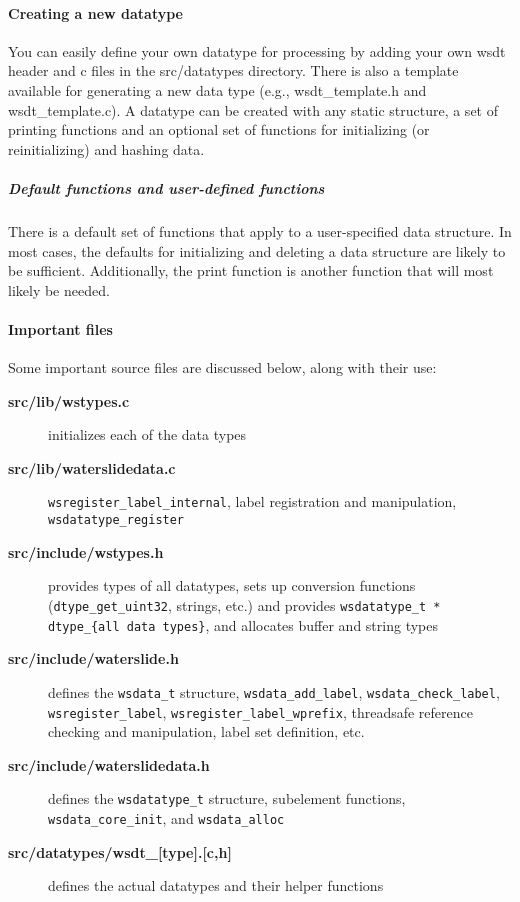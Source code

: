 \documentclass[11pt]{article}
\begin{document}
\paragraph{Creating a new datatype\newline\newline}

You can easily define your own datatype for processing by adding your own 
wsdt header and c files in the src/datatypes directory. There is also a 
template  available for generating a new data type (e.g., wsdt\_template.h and 
wsdt\_template.c).  A datatype can be created with any  static structure, a set
of printing functions and an optional set of functions for initializing (or 
reinitializing) and hashing data.

\subparagraph{Default functions and user-defined functions\newline\newline}
There is a default set of functions that apply to a user-specified data 
structure.  In most cases, the defaults for initializing and deleting a data 
structure are likely to be sufficient.  Additionally, the print function is 
another function that will most likely be needed.   

\paragraph{Important files\newline\newline}

Some important source files are discussed below, along with their use:
\begin{description}
\item[\textbf{src/lib/wstypes.c}] initializes each of the data types
\item[\textbf{src/lib/waterslidedata.c}] \texttt{wsregister\_label\_internal}, 
label registration and manipulation, \newline\texttt{wsdatatype\_register}
\item[\textbf{src/include/wstypes.h}] provides types of all datatypes, sets up 
conversion functions \newline(\texttt{dtype\_get\_uint32}, strings, etc.) and provides 
\texttt{wsdatatype\_t * dtype\_\{all data types\}}, and allocates buffer 
and string types
\item[\textbf{src/include/waterslide.h}] defines the \texttt{wsdata\_t} structure, 
\texttt{wsdata\_add\_label}, \newline\texttt{wsdata\_check\_label}, 
\texttt{wsregister\_label}, \texttt{wsregister\_label\_wprefix}, 
threadsafe reference checking and manipulation,  label set definition, etc.
\item[\textbf{src/include/waterslidedata.h}] defines the \texttt{wsdatatype\_t} 
structure, subelement functions, \newline\texttt{wsdata\_core\_init}, and
\texttt{wsdata\_alloc}
\item[\textbf{src/datatypes/wsdt\_[type].[c,h]}] defines the actual datatypes and 
their helper functions
\end{description}
\end{document}
